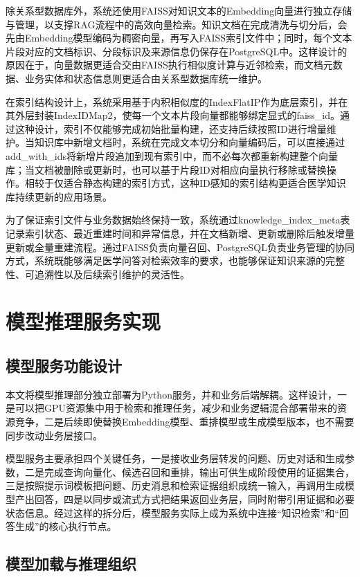 除关系型数据库外，系统还使用FAISS对知识文本的Embedding向量进行独立存储与管理，以支撑RAG流程中的高效向量检索。知识文档在完成清洗与切分后，会先由Embedding模型编码为稠密向量，再写入FAISS索引文件中；同时，每个文本片段对应的文档标识、分段标识及来源信息仍保存在PostgreSQL中。这样设计的原因在于，向量数据更适合交由FAISS执行相似度计算与近邻检索，而文档元数据、业务实体和状态信息则更适合由关系型数据库统一维护。

在索引结构设计上，系统采用基于内积相似度的IndexFlatIP作为底层索引，并在其外层封装IndexIDMap2，使每一个文本片段向量都能够绑定显式的faiss\_id。通过这种设计，索引不仅能够完成初始批量构建，还支持后续按照ID进行增量维护。当知识库中新增文档时，系统在完成文本切分和向量编码后，可以直接通过add\_with\_ids将新增片段追加到现有索引中，而不必每次都重新构建整个向量库；当文档被删除或更新时，也可以基于片段ID对相应向量执行移除或替换操作。相较于仅适合静态构建的索引方式，这种ID感知的索引结构更适合医学知识库持续更新的应用场景。

为了保证索引文件与业务数据始终保持一致，系统通过knowledge\_index\_meta表记录索引状态、最近重建时间和异常信息，并在文档新增、更新或删除后触发增量更新或全量重建流程。通过FAISS负责向量召回、PostgreSQL负责业务管理的协同方式，系统既能够满足医学问答对检索效率的要求，也能够保证知识来源的完整性、可追溯性以及后续索引维护的灵活性。

\section{模型推理服务实现}

\subsection{模型服务功能设计}

本文将模型推理部分独立部署为Python服务，并和业务后端解耦。这样设计，一是可以把GPU资源集中用于检索和推理任务，减少和业务逻辑混合部署带来的资源竞争，二是后续即使替换Embedding模型、重排模型或生成模型版本，也不需要同步改动业务层接口。

模型服务主要承担四个关键任务，一是接收业务层转发的问题、历史对话和生成参数，二是完成查询向量化、候选召回和重排，输出可供生成阶段使用的证据集合，三是按照提示词模板把问题、历史消息和检索证据组织成统一输入，再调用生成模型产出回答，四是以同步或流式方式把结果返回业务层，同时附带引用证据和必要状态信息。经过这样的拆分后，模型服务实际上成为系统中连接“知识检索”和“回答生成”的核心执行节点。

\subsection{模型加载与推理组织}

